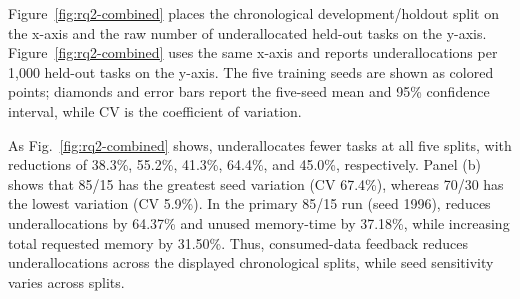 Figure~\ref{fig:rq2-combined} places the
chronological development/holdout split on the x-axis and the raw number of
underallocated held-out tasks on the y-axis.
Figure~\ref{fig:rq2-combined} uses the same x-axis and
reports \toolname{} underallocations per
1,000 held-out tasks on the y-axis. The five training seeds are shown as
colored points; diamonds and error bars report the five-seed mean and 95\%
confidence interval, while CV is the coefficient of variation.

As Fig.~\ref{fig:rq2-combined} shows,
\toolname{} underallocates fewer tasks at all five splits, with reductions of
38.3\%, 55.2\%, 41.3\%, 64.4\%, and 45.0\%, respectively. Panel (b) shows that
85/15 has the greatest seed variation (CV 67.4\%), whereas 70/30 has the lowest
variation (CV 5.9\%). In the primary 85/15 run (seed 1996), \toolname{} reduces
underallocations by 64.37\% and unused memory-time by 37.18\%, while increasing
total requested memory by 31.50\%. Thus, consumed-data feedback reduces
underallocations across the displayed chronological splits, while seed
sensitivity varies across splits.




